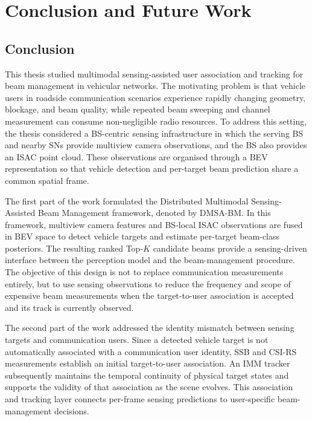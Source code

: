 \chapter{Conclusion and Future Work}
\label{ch:conclusion}

\section{Conclusion}
\label{sec:conclusion-summary}

This thesis studied multimodal sensing-assisted user association and tracking
for beam management in vehicular networks. The motivating problem is that
vehicle users in roadside communication scenarios experience rapidly changing
geometry, blockage, and beam quality, while repeated beam sweeping and channel
measurement can consume non-negligible radio resources. To address this
setting, the thesis considered a BS-centric sensing infrastructure in which the
serving BS and nearby SNs provide multiview
camera observations, and the BS also provides an ISAC point cloud. These
observations are organised through a BEV representation so
that vehicle detection and per-target beam prediction share a common spatial
frame.

The first part of the work formulated the Distributed Multimodal
Sensing-Assisted Beam Management framework, denoted by DMSA-BM. In this
framework, multiview camera features and
BS-local ISAC observations are fused in BEV space to detect vehicle targets and estimate
per-target beam-class posteriors. The resulting ranked Top-$K$ candidate beams
provide a sensing-driven interface between the perception model and the
beam-management procedure. The objective of this design is not to replace
communication measurements entirely, but to use sensing observations to reduce
the frequency and scope of expensive beam measurements when the target-to-user
association is accepted and its track is currently observed.

The second part of the work addressed the identity mismatch between sensing
targets and communication users. Since a detected vehicle target is not
automatically associated with a communication user identity, SSB and CSI-RS
measurements establish an initial target-to-user association. An IMM tracker
subsequently maintains the temporal continuity of
physical target states and supports the validity of that association as the
scene evolves. This association and tracking layer connects per-frame sensing
predictions to user-specific beam-management decisions.

